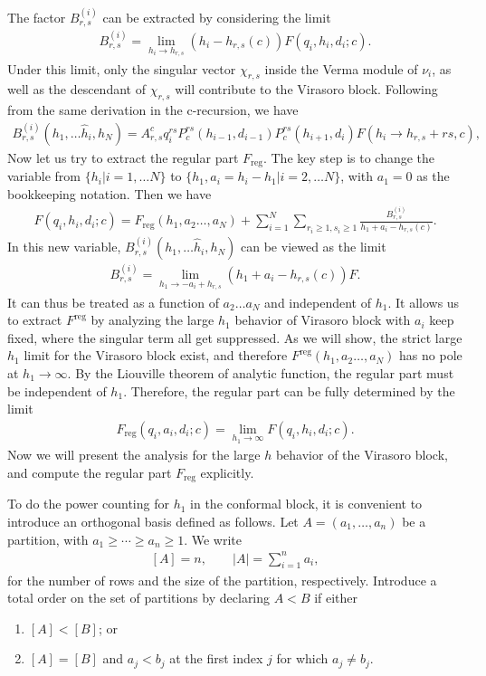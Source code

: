 \documentclass[12pt]{article}
\newcommand{\ie}{\begin{equation}\begin{aligned}}
\newcommand{\fe}{\end{aligned}\end{equation}}
\numberwithin{equation}{section}
\begin{document}
The factor $B^{(i)}_{r,s}$ can be extracted by considering the limit 
\ie
B^{(i)}_{r,s}=\lim_{h_i\rightarrow h_{r,s}} \left(h_i-h_{r,s}(c)\right) F(q_i,h_i,d_i;c).
\fe
Under this limit, only the singular vector $\chi_{r,s}$ inside the Verma module of $\nu_i$,  as well as the descendant of $\chi_{r,s}$ will contribute to the Virasoro block. Following from the same derivation in the c-recursion, we have 
\ie\label{virasoro_Res}
B^{(i)}_{r,s}(h_1,\dots \hat{h}_i, h_N) =A_{r,s}^c q_i^{rs} P_c^{rs}(h_{i-1}, d_{i-1}) P_c^{rs}(h_{i+1}, d_{i}) F(h_i\rightarrow h_{r,s}+rs, c),
\fe 
Now let us try to extract the regular part $F_{\text{reg}}$. The key step is to change the variable from $\{h_i |i=1,\dots N \}$ to $\{h_1,a_i=h_i-h_1 |i=2,\dots N \}$, with $a_1=0$ as the bookkeeping notation. Then we have
\ie
F(q_i,h_i,d_i;c)= F_{\text{reg}} (h_1,a_2\dots ,a_N)+ \sum_{i=1}^N \sum_{r_i\geq 1, s_i\geq 1}\frac{B^{(i)}_{r,s}}{h_1+a_i- h_{r,s}(c)}.
\fe
In this new variable, $B^{(i)}_{r,s}(h_1,\dots \hat{h}_i, h_N)$ can be viewed as the limit
\ie
B^{(i)}_{r,s}=\lim_{h_1\rightarrow -a_i+h_{r,s}} \left(h_1+a_i-h_{r,s}(c)\right) F.
\fe
It can thus be treated as a function of $a_2\dots a_N$ and independent of $h_1$. It allows us to extract $F^{\text{reg}}$ by analyzing the large $h_1$ behavior of Virasoro block with $a_i$ keep fixed, where the singular term all get suppressed. As we will show, the strict large $h_1$ limit for the Virasoro block exist, and therefore $F^{\text{reg}} (h_1,a_2\dots ,a_N)$ has no pole at $h_1\rightarrow \infty$. By the Liouville theorem of analytic function, the regular part must be independent of $h_1$. Therefore, the regular part can be fully determined by the limit
\ie
F_{\text{reg}} (q_i, a_i,d_i ; c) =\lim_{h_1\rightarrow \infty} F(q_i,h_i,d_i;c).
\fe
Now we will present the analysis for the large $h$ behavior of the Virasoro block, and compute the regular part $F_{\text{reg}}$ explicitly. 

To do the power counting for $h_1$ in the conformal block, it is convenient to introduce an orthogonal basis defined as follows. Let $A=(a_1,\ldots,a_n)$ be a partition, with
$a_1\geq\cdots\geq a_n\geq1$. We write
\ie
[A]=n,
\qquad
|A|=\sum_{i=1}^{n}a_i,
\fe
for the number of rows and the size of the partition, respectively. Introduce a total order on the set of partitions by declaring $A<B$
if either
\begin{enumerate}
    \item $[A]<[B]$; or
    \item $[A]=[B]$ and $a_j<b_j$ at the first index $j$ for which
    $a_j\neq b_j$.
\end{enumerate}
\end{document}
